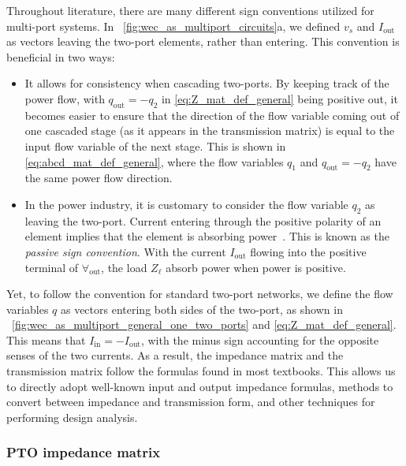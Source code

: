 \documentclass[lettersize,journal]{IEEEtran}
\begin{document}
Throughout literature, there are many different sign conventions utilized for multi-port systems. 
In \figurename~\ref{fig:wec_as_multiport_circuits}a, we defined $v_s$ and $I_{\textrm{out}}$ as vectors leaving the two-port elements, rather than entering. 
This convention is beneficial in two ways:
\begin{itemize}
         \item It allows for consistency when cascading two-ports. 
         By keeping track of the power flow, with $q_{\textrm{out}} = -q_2$ in \eqref{eq:Z_mat_def_general} being positive out, it becomes easier to ensure that the direction of the flow variable coming out of one cascaded stage (as it appears in the transmission matrix) is equal to the input flow variable of the next stage. 
         This is shown in \eqref{eq:abcd_mat_def_general}, where the flow variables $q_1$ and $q_{\textrm{out}} = -q_2$ have the same power flow direction.

         \item In the power industry, it is customary to consider the flow variable $q_2$ as leaving the two-port. 
         Current entering through the positive polarity of an element implies that the element is absorbing power~\cite{CircuitFundamental}.
         This is known as the \textit{passive sign convention}.
         With the current $I_{\textrm{out}}$ flowing into the positive terminal of $\forall_{\textrm{out}}$, the load $Z_\ell$ absorb power when power is positive.
\end{itemize}
Yet, to follow the convention for standard two-port networks, we define the flow variables $q$ as vectors entering both sides of the two-port, as shown in \figurename~\ref{fig:wec_as_multiport_general_one_two_ports} and \eqref{eq:Z_mat_def_general}. 
This means that $I_{\textrm{in}} = -I_{\textrm{out}}$, with the minus sign accounting for the opposite senses of the two currents. 
As a result, the impedance matrix and the transmission matrix follow the formulas found in most textbooks. 
This allows us to directly adopt well-known input and output impedance formulas, methods to convert between impedance and transmission form, and other techniques for performing design analysis.


\subsubsection{PTO impedance matrix}\label{sec:pto_impedance_matrix}
\end{document}
